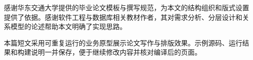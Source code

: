感谢华东交通大学提供的毕业论文模板与撰写规范，为本文的结构组织和版式设置提供了依据。感谢软件工程与数据库相关教材作者，其对需求分析、分层设计和关系模型的论述帮助本文明确了实现思路。

本篇短文采用可重复运行的业务原型展示论文写作与排版效果。示例源码、运行结果和构建说明一并保存，便于继续修改内容并核对编译后的页面。
